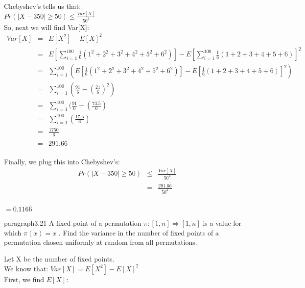 \documentclass{article}
\begin{document}
Chebyshev's tells us that: \\

${ Pr(|X - 350| \geq 50) \leq \frac{Var[X]}{50^2} }$ \\

So, next we will find Var[X]: \\

\begin{eqnarray*}
    Var[X] & = & E[X^2] - E[X]^2 \\
           & = & E[ \sum_{i=1}^{100} \frac{1}{6} ( 1^2 + 2^2 + 3^2 + 4^2 + 5^2 + 6^2) ] - E[ \sum_{i=1}^{100} \frac{1}{6} ( 1 + 2 + 3 + 4 + 5 + 6) ]^2 \\
           & = & \sum_{i=1}^{100} ( E[ \frac{1}{6} ( 1^2 + 2^2 + 3^2 + 4^2 + 5^2 + 6^2) ] - E[\frac{1}{6} ( 1 + 2 + 3 + 4 + 5 + 6) ]^2 ) \\
           & = & \sum_{i=1}^{100} ( \frac{91}{6} - ( \frac{21}{6} )^2 ) \\
           & = & \sum_{i=1}^{100} ( \frac{91}{6} - ( \frac{73.5}{6} ) \\
           & = & \sum_{i=1}^{100} ( \frac{17.5}{6} ) \\
           & = & \frac{1750}{6} \\
           & = & 291.6\bar{6}  \\
\end{eqnarray*}

Finally, we plug this into Chebyshev's: \\

\begin{eqnarray*}
    Pr(| X - 350| \geq 50) & \leq & \frac{Var[X]}{50^2} \\
                             & = & \frac{291.6\bar{6}}{50^2} \\
\end{eqnarray*}
\begin{center}
    $\boxed{=0.116\bar{6}}$
\end{center}

paragraph{3.21 A fixed point of a permutation ${\pi : [1,n] \Rightarrow [1,n] }$ 
is a value for which ${\pi (x) = x}$ . Find the variance in the number of fixed
points of a permutation chosen uniformly at random from all permutations.}

Let X be the number of fixed points. \\

We know that: ${ Var[X] = E[X^2] - E[X]^2 }$ \\

First, we find ${E[X]}$: \\
\end{document}
